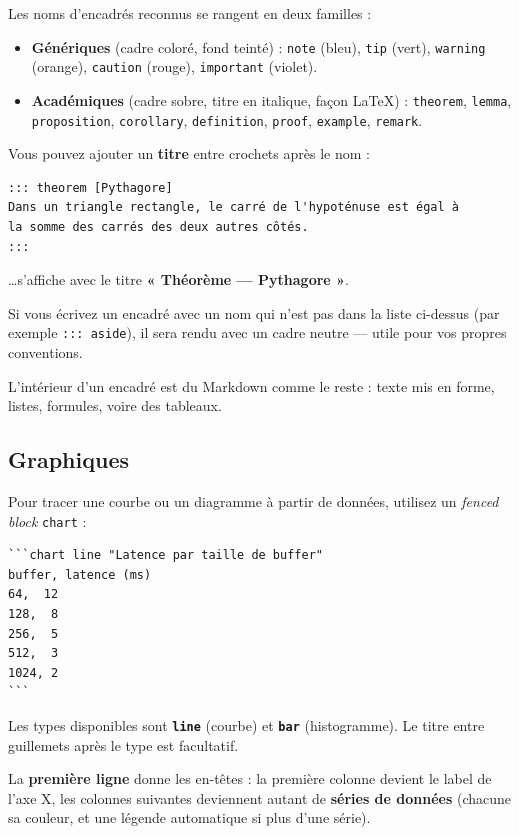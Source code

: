 \documentclass[11pt,a4paper]{article}
\theoremstyle{definition}
\begin{document}
Les noms d'encadrés reconnus se rangent en deux familles :


\begin{itemize}
  \item \textbf{Génériques} (cadre coloré, fond teinté) :
\texttt{note} (bleu), \texttt{tip} (vert), \texttt{warning} (orange), \texttt{caution} (rouge),
\texttt{important} (violet).
  \item \textbf{Académiques} (cadre sobre, titre en italique, façon LaTeX) :
\texttt{theorem}, \texttt{lemma}, \texttt{proposition}, \texttt{corollary}, \texttt{definition},
\texttt{proof}, \texttt{example}, \texttt{remark}.
\end{itemize}


Vous pouvez ajouter un \textbf{titre} entre crochets après le nom :


\begin{lstlisting}
::: theorem [Pythagore]
Dans un triangle rectangle, le carré de l'hypoténuse est égal à
la somme des carrés des deux autres côtés.
:::
\end{lstlisting}


…s'affiche avec le titre \textbf{« Théorème — Pythagore »}.


Si vous écrivez un encadré avec un nom qui n'est pas dans la liste
ci-dessus (par exemple \texttt{::: aside}), il sera rendu avec un cadre
neutre — utile pour vos propres conventions.


L'intérieur d'un encadré est du Markdown comme le reste : texte mis
en forme, listes, formules, voire des tableaux.


\subsection{Graphiques}

Pour tracer une courbe ou un diagramme à partir de données, utilisez
un \emph{fenced block} \texttt{chart} :


\begin{lstlisting}
```chart line "Latence par taille de buffer"
buffer, latence (ms)
64,  12
128,  8
256,  5
512,  3
1024, 2
```
\end{lstlisting}


Les types disponibles sont \textbf{\texttt{line}} (courbe) et \textbf{\texttt{bar}}
(histogramme). Le titre entre guillemets après le type est
facultatif.


La \textbf{première ligne} donne les en-têtes : la première colonne
devient le label de l'axe X, les colonnes suivantes deviennent autant
de \textbf{séries de données} (chacune sa couleur, et une légende
automatique si plus d'une série).
\end{document}
